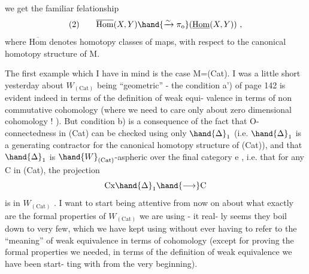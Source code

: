 we get the familiar felationship
\[ \text{(2)} \qquad \overline{\mathrm{Hom}}(X,Y)\hand{\xrightarrow{\sim}\pi_{\mathrm{o}}}(\underline{\mathrm{Hom}}(X,Y)) \ , \]
where $\overline{\mathrm{Hom}}$ denotes homotopy classes of maps,  with respect to the canonical
homotopy structure of M.

The first example which I have in mind is the case M=(Cat).  I was
a little short yesterday about $W_{(\mathrm{Cat})}$ being ``geometric''  -  the condition
a') of page 142 is evident indeed in terms of the  definition of weak equi-%
valence in terms of non commutative cohomology (where we need to care only
about zero dimensional cohomology ! ).  But condition b) is a consequence
of the fact that O-connectedness in (Cat) can be checked using only $\hand{\Delta}_1$
(i.e. $\hand{\Delta}_1$ is a generating contractor for the canonical homotopy structure
of (Cat)),  and that $\hand{\Delta}_1$ is $\hand{W}_{(\mathrm{Cat})}$-aspheric over the final category e ,
i.e. that for any C in (Cat),  the projection
\[ \mathrm{C}\mathrm{x}\hand{\Delta}_1 \hand{\longrightarrow} \mathrm{C} \]
is in $W_{(\mathrm{Cat})}$ .  I want to start being attentive from now on about what
exactly are the formal properties  of $W_{(\mathrm{Cat})}$  we are using  -  it real-%
ly seems they boil down to very  few,  which we have kept using
without ever having to refer to the ``meaning'' of weak equivalence in
terms of cohomology (except for proving the formal properties we needed,
in terms of the  definition  of weak equivalence we have been start-%
ting with from the very beginning).

